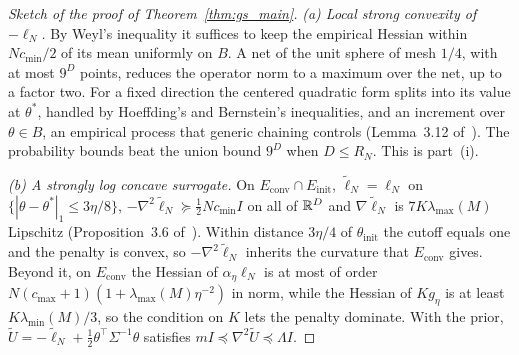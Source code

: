 \begin{proof}[Sketch of the proof of Theorem~\ref{thm:gs_main}]
\emph{(a) Local strong convexity of $-\ell_N$.} By Weyl's inequality it suffices to keep the empirical Hessian within $Nc_{\min}/2$ of its mean uniformly on $B$. A net of the unit sphere of mesh $1/4$, with at most $9^D$ points, reduces the operator norm to a maximum over the net, up to a factor two. For a fixed direction the centered quadratic form splits into its value at $\theta^*$, handled by Hoeffding's and Bernstein's inequalities, and an increment over $\theta\in B$, an empirical process that generic chaining controls (Lemma~3.12 of~\cite{nicklwang2024}). The probability bounds beat the union bound $9^D$ when $D\le R_N$. This is part~(i).

\emph{(b) A strongly log concave surrogate.} On $E_{\mathrm{conv}}\cap E_{\mathrm{init}}$, $\tilde\ell_N=\ell_N$ on $\{|\theta-\theta^*|_1\le3\eta/8\}$, $-\nabla^2\tilde\ell_N\succeq\frac12Nc_{\min}I$ on all of $\mathbb{R}^D$ and $\nabla\tilde\ell_N$ is $7K\lambda_{\max}(M)$ Lipschitz (Proposition~3.6 of~\cite{nicklwang2024}). Within distance $3\eta/4$ of $\theta_{\mathrm{init}}$ the cutoff equals one and the penalty is convex, so $-\nabla^2\tilde\ell_N$ inherits the curvature that $E_{\mathrm{conv}}$ gives. Beyond it, on $E_{\mathrm{conv}}$ the Hessian of $\alpha_\eta\ell_N$ is at most of order $N(c_{\max}+1)(1+\lambda_{\max}(M)\eta^{-2})$ in norm, while the Hessian of $Kg_\eta$ is at least $K\lambda_{\min}(M)/3$, so the condition on $K$ lets the penalty dominate. With the prior, $\tilde U=-\tilde\ell_N+\frac12\theta^\top\Sigma^{-1}\theta$ satisfies $mI\preceq\nabla^2\tilde U\preceq\Lambda I$.


\end{proof}
